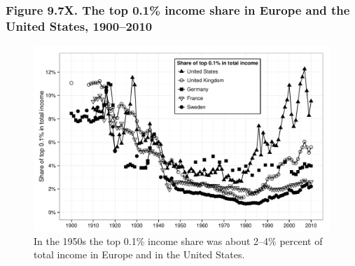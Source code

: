 \documentclass[t]{beamer}\usepackage[]{graphicx}\usepackage[]{color}
\newenvironment{knitrout}{}{} %
\begin{document}
\begin{frame}[label=Figure_9_7X]
\frametitle{Figure 9.7X. The top 0.1\% income share in Europe and the United States, 1900--2010}
\begin{figure}[t]
\begin{minipage}[b]{\textwidth}
\centering
\begin{knitrout}\footnotesize
{}\color{fgcolor}

{\centering \includegraphics[width=1\linewidth]{figures/bw/Figure_9_7X} 

}



\end{knitrout}
\caption{In the 1950s the top 0.1\% income share was about 2--4\% percent of total income in Europe and in the United States.}
\end{minipage}
\end{figure}
\end{frame}
\end{document}
